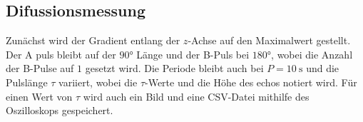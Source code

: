 \subsection{Difussionsmessung}
Zunächst wird der Gradient entlang der $z$-Achse auf den Maximalwert gestellt. 
Der A puls bleibt auf der $90°$ Länge und der B-Puls bei $180°$, wobei die Anzahl der B-Pulse auf $1$ gesetzt wird.
Die Periode bleibt auch bei $ P = \SI{10}{\second}$ und die Pulslänge $\tau$ variiert, wobei die $\tau$-Werte und die Höhe des echos notiert wird.
Für einen Wert von $\tau$ wird auch ein Bild und eine CSV-Datei mithilfe des Oszilloskops gespeichert.